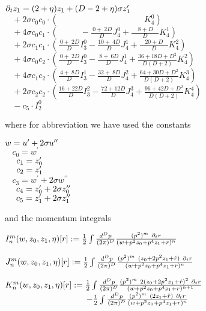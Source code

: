 \documentclass[a4paper,aps,prl,twocolumn,groupedaddress]{revtex4}
\begin{document}
\bigskip $ \partial_t z_1 = (2+\eta) z_1 + (D-2+\eta) \sigma z_1^\prime $\\
$ ~~~~ + 2 \sigma c_0 c_0 \cdot ( ~~~~~~~~~~~~~~~~~~~~~~~~~~~~~~~~~~~~~~~~~~~~~\;             K_4^0 ) $\\
$ ~~~~ + 4 \sigma c_0 c_1 \cdot ( ~~~~~~~~~~~~            - \frac{~0+~2D}{D} J_4^0 + \frac{~~~~~8+D~~~\;}{D} K_4^1 ) $\\
$ ~~~~ + 2 \sigma c_1 c_1 \cdot ( \frac{~0+~2D}{D} I_3^0 - \frac{10+~4D}{D} J_4^1 + \frac{~~~~20+D~~~\,}{D} K_4^2 ) $\\
$ ~~~~ + 4 \sigma c_0 c_2 \cdot ( \frac{~0+~2D}{D} I_3^0 - \frac{~8+~6D}{D} J_4^1 + \frac{36+18D+D^2}{D(D+2)} K_4^2 ) $\\
$ ~~~~ + 4 \sigma c_1 c_2 \cdot ( \frac{~4+~8D}{D} I_3^1 - \frac{32+~8D}{D} J_4^2 + \frac{64+30D+D^2}{D(D+2)} K_4^3 ) $\\
$ ~~~~ + 2 \sigma c_2 c_2 \cdot ( \frac{16+22D}{D} I_3^2 - \frac{72+12D}{D} J_4^3 + \frac{96+42D+D^2}{D(D+2)} K_4^4 ) $\\
$ ~~~~ - c_5 \cdot I_2^0 $

\bigskip
\noindent
where for abbreviation we have used the constants

\bigskip $ w = u^\prime + 2 \sigma u^{\prime\prime} $\\
$ ~~~~ c_0 = w^\prime $\\
$ ~~~~ c_1 = {z_0^\prime} $\\
$ ~~~~ c_2 = {z_1^\prime} $\\
$ ~~~~ c_3 = w^\prime + 2 \sigma w^{\prime\prime} $\\
$ ~~~~ c_4 = {z_0^\prime} + 2 \sigma z_0^{\prime\prime} $\\
$ ~~~~ c_5 = {z_1^\prime} + 2 \sigma z_1^{\prime\prime} $

\bigskip
\noindent
and the momentum integrals

\bigskip $ I^m_n(w,z_0,z_1,\eta)[r] := \frac{1}{2} \int \frac{d^Dp}{(2\pi)^D} \frac{(p^2)^m ~ \partial_t r}{(w+p^2z_0+p^4z_1+r)^n} $

\smallskip $ J^m_n(w,z_0,z_1,\eta)[r] := \frac{1}{2} \int \frac{d^Dp}{(2\pi)^D} \frac{(p^2)^m ~ (z_0+2 p^2 z_1+\dot{r}) ~ \partial_t r}{(w+p^2z_0+p^4z_1+r)^n} $

\smallskip $ K^m_n(w,z_0,z_1,\eta)[r] := \frac{1}{2} \int \frac{d^Dp}{(2\pi)^D} \frac{(p^2)^m ~ 2(z_0+2 p^2 z_1+\dot{r})^2 ~ \partial_t r}{(w+p^2z_0+p^4z_1+r)^{n+1}} $\\
$ ~~~~~~~~~~~~~~~~~~~~~~~~~~~~~ - \frac{1}{2} \int \frac{d^Dp}{(2\pi)^D} \frac{(p^2)^m ~ (2z_1 + \ddot{r}) ~ \partial_t r}{(w+p^2z_0+p^4z_1+r)^n} $
\end{document}
